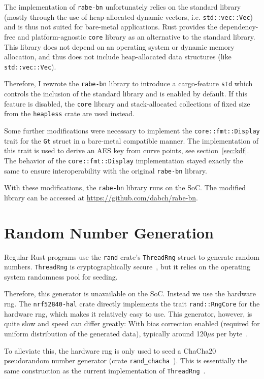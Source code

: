 The implementation of \texttt{rabe-bn} unfortunately relies on the standard library (mostly through the use of heap-allocated dynamic vectors, i.e. \texttt{std::vec::Vec}) and is thus not suited for bare-metal applications.
Rust provides the dependency-free and platform-agnostic \texttt{core} library as an alternative to the standard library.
This library does not depend on an operating system or dynamic memory allocation, and thus does not include heap-allocated data structures (like \texttt{std::vec::Vec}).

Therefore, I rewrote the \texttt{rabe-bn} library to introduce a cargo-feature \texttt{std} which controls the inclusion of the standard library and is enabled by default.
If this feature is disabled, the \texttt{core} library and stack-allocated collections of fixed size from the \texttt{heapless} crate are used instead.

Some further modifications were necessary to implement the \texttt{core::fmt::Display} trait for the \texttt{Gt} struct in a bare-metal compatible manner.
The implementation of this trait is used to derive an AES key from curve points, see section~\ref{sec:kdf}.
The behavior of the \texttt{core::fmt::Display} implementation stayed exactly the same to ensure interoperability with the original \texttt{rabe-bn} library.

With these modifications, the \texttt{rabe-bn} library runs on the SoC.
The modified library can be accessed at \url{https://github.com/dabch/rabe-bn}.

\section{Random Number Generation}
Regular Rust programs use the \texttt{rand} \gls{crate}'s \verb+ThreadRng+ struct to generate random numbers.
\texttt{ThreadRng} is cryptographically secure~\cite{noauthor_rust_nodate}, but it relies on the operating system randomness pool for seeding.

Therefore, this generator is unavailable on the SoC.
Instead we use the hardware \acrshort{rng}.
The \texttt{nrf52840-hal} crate directly implements the trait \texttt{rand::RngCore} for the hardware \acrshort{rng}, which makes it relatively easy to use.
This generator, however, is quite slow and speed can differ greatly: With bias correction enabled (required for uniform distribution of the generated data), typically around 120$\mu$s per byte~\cite{nordic_semiconductor_nrf52840_nodate}.

To alleviate this, the hardware \acrshort{rng} is only used to seed a ChaCha20 pseudorandom number generator (crate \texttt{rand\_chacha}~\cite{noauthor_rand_chacha_nodate}).
This is essentially the same construction as the current implementation of \texttt{ThreadRng}~\cite{noauthor_rust_nodate}.

